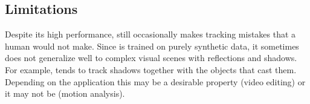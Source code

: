 \subsection{Limitations}%
\label{s:limitations}

Despite its high performance, \method still occasionally makes tracking mistakes that a human would not make.
Since \method is trained on purely synthetic data, it sometimes does not generalize well to complex visual scenes with reflections and shadows. For example, \method tends to track shadows together with the objects that cast them.
Depending on the application this may be a desirable property (\eg video editing) or it may not be (\eg motion analysis).
